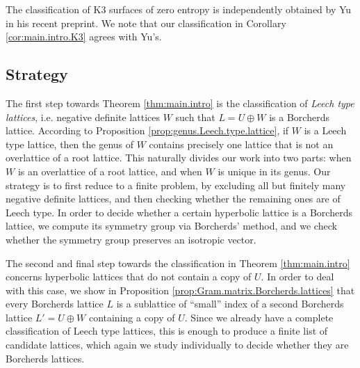 \documentclass[11pt,letterpaper]{amsart}
\begin{document}
The classification of K3 surfaces of zero entropy is independently obtained by Yu \cite[Theorem~1.1]{yu.entropy} in his recent preprint. We note that our classification in Corollary \ref{cor:main.intro.K3} agrees with Yu's.

\subsection{Strategy}
The first step towards Theorem \ref{thm:main.intro} is the classification of \emph{Leech type lattices}, i.e. negative definite lattices $W$ such that $L=U\oplus W$ is a Borcherds lattice.
According to Proposition \ref{prop:genus.Leech.type.lattice}, if $W$ is a Leech type lattice, then the genus of $W$ contains precisely one lattice that is not an overlattice of a root lattice. This naturally divides our work into two parts: when $W$ is an overlattice of a root lattice, and when $W$ is unique in its genus. Our strategy is to first reduce to a finite problem, by excluding all but finitely many negative definite lattices, and then checking whether the remaining ones are of Leech type. In order to decide whether a certain hyperbolic lattice is a Borcherds lattice, we compute its symmetry group via Borcherds' method, and we check whether the symmetry group preserves an isotropic vector.

The second and final step towards the classification in Theorem \ref{thm:main.intro} concerns hyperbolic lattices that do not contain a copy of $U$. In order to deal with this case, we show in Proposition \ref{prop:Gram.matrix.Borcherds.lattices} that every Borcherds lattice $L$ is a sublattice of ``small'' index of a second Borcherds lattice $L'=U\oplus W$ containing a copy of $U$. Since we already have a complete classification of Leech type lattices, this is enough to produce a finite list of candidate lattices, which again we study individually to decide whether they are Borcherds lattices. 
\end{document}
